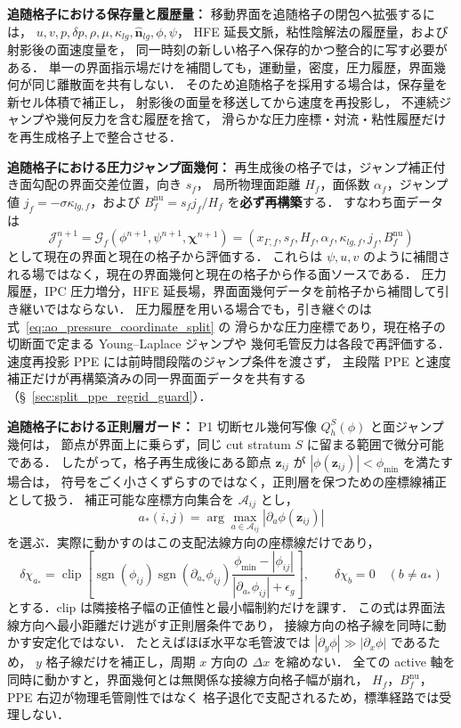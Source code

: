 \textbf{追随格子における保存量と履歴量：}
移動界面を追随格子の閉包へ拡張するには，
$u,v,p,\delta p,\rho,\mu,\kappa_{lg},\hat{\bm n}_{lg},\phi,\psi$，
HFE 延長文脈，粘性陰解法の履歴量，および射影後の面速度量を，
同一時刻の新しい格子へ保存的かつ整合的に写す必要がある．
単一の界面指示場だけを補間しても，運動量，密度，圧力履歴，界面幾何が同じ離散面を共有しない．
そのため追随格子を採用する場合は，保存量を新セル体積で補正し，
射影後の面量を移送してから速度を再投影し，
不連続ジャンプや幾何反力を含む履歴を捨て，
滑らかな圧力座標・対流・粘性履歴だけを再生成格子上で整合させる．

\textbf{追随格子における圧力ジャンプ面幾何：}
再生成後の格子では，ジャンプ補正付き面勾配の界面交差位置，向き $s_f$，
局所物理面距離 $H_f$，面係数 $\alpha_f$，ジャンプ値
$j_f=-\sigma\kappa_{lg,f}$，および
$B_f^{\mathrm{nu}}=s_fj_f/H_f$ を\textbf{必ず再構築}する．
すなわち面データは
\[
  \mathcal{J}_f^{n+1}
  =
  \mathcal{G}_f\!\left(\phi^{n+1},\psi^{n+1},\bm{\chi}^{n+1}\right)
  =
  \left(x_{\Gamma,f},s_f,H_f,\alpha_f,
        \kappa_{lg,f},j_f,B_f^{\mathrm{nu}}\right)
  \label{eq:regrid_face_geometry}
\]
として現在の界面と現在の格子から評価する．
これらは $\psi,u,v$ のように補間される場ではなく，現在の界面幾何と現在の格子から作る面ソースである．
圧力履歴，IPC 圧力増分，HFE 延長場，界面面幾何データを前格子から補間して引き継いではならない．
圧力履歴を用いる場合でも，引き継ぐのは式~\eqref{eq:ao_pressure_coordinate_split} の
滑らかな圧力座標であり，現在格子の切断面で定まる Young--Laplace ジャンプや
幾何毛管反力は各段で再評価する．
速度再投影 PPE には前時間段階のジャンプ条件を渡さず，
主段階 PPE と速度補正だけが再構築済みの同一界面面データを共有する
（§~\ref{sec:split_ppe_regrid_guard}）．

\textbf{追随格子における正則層ガード：}
P1 切断セル幾何写像 $Q_h^S(\phi)$ と面ジャンプ幾何は，
節点が界面上に乗らず，同じ cut stratum $S$ に留まる範囲で微分可能である．
したがって，格子再生成後にある節点 $\bm z_{ij}$ が
$|\phi(\bm z_{ij})|<\phi_{\min}$ を満たす場合は，
符号をごく小さくずらすのではなく，正則層を保つための座標線補正として扱う．
補正可能な座標方向集合を $\mathcal{A}_{ij}$ とし，
\begin{equation}
  a_\ast(i,j)=
  \arg\max_{a\in\mathcal{A}_{ij}}
  |\partial_a\phi(\bm z_{ij})|
  \label{eq:grid_regular_stratum_axis}
\end{equation}
を選ぶ．実際に動かすのはこの支配法線方向の座標線だけであり，
\begin{equation}
  \delta\chi_{a_\ast}
  =
  \operatorname{clip}\!\left[
  \operatorname{sgn}(\phi_{ij})\operatorname{sgn}(\partial_{a_\ast}\phi_{ij})
  \frac{\phi_{\min}-|\phi_{ij}|}{|\partial_{a_\ast}\phi_{ij}|+\epsilon_g}
  \right],
  \qquad
  \delta\chi_b=0\quad(b\ne a_\ast)
  \label{eq:grid_regular_stratum_shift}
\end{equation}
とする．clip は隣接格子幅の正値性と最小幅制約だけを課す．
この式は界面法線方向へ最小距離だけ逃がす正則層条件であり，
接線方向の格子線を同時に動かす安定化ではない．
たとえばほぼ水平な毛管波では $|\partial_y\phi|\gg|\partial_x\phi|$ であるため，
$y$ 格子線だけを補正し，周期 $x$ 方向の $\Delta x$ を縮めない．
全ての active 軸を同時に動かすと，界面幾何とは無関係な接線方向格子幅が崩れ，
$H_f$，$B_f^{\mathrm{nu}}$，PPE 右辺が物理毛管剛性ではなく
格子退化で支配されるため，標準経路では受理しない．

